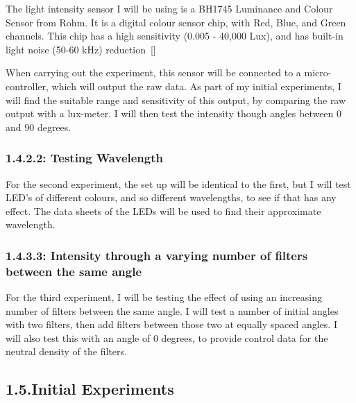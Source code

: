 \documentclass{article}
\begin{document}
The light intensity sensor I will be using is a BH1745 Luminance and Colour Sensor from Rohm. It is a digital colour sensor chip, with Red, Blue, and Green channels. This chip has a high sensitivity (0.005 - 40,000 Lux), and has built-in light noise (50-60 kHz) reduction~{}[]%

When carrying out the experiment, this sensor will be connected to a micro-controller, which will output the raw data. As part of my initial experiments, I will find the suitable range and sensitivity of this output, by comparing the raw output with a lux-meter. I will then test the intensity though angles between 0 and 90 degrees.%

\subsubsection{1.4.2.\hspace*{0.5em}2: Testing Wavelength}\label{sec-2--testing-wavelength}%

\noindent{}For the second experiment, the set up will be identical to the first, but I will test LED's of different colours, and so different wavelengths, to see if that has any effect. The data sheets of the LEDs will be used to find their approximate wavelength.%

\subsubsection{1.4.3.\hspace*{0.5em}3: Intensity through a varying number of filters between the same angle}\label{sec-3--intensity-through-a-varying-number-of-filters-between-the-same-angle}%

\noindent{}For the third experiment, I will be testing the effect of using an increasing number of filters between the same angle. I will test a number of initial angles with two filters, then add filters between those two at equally spaced angles. I will also test this with an angle of 0 degrees, to provide control data for the neutral density of the filters.%

\subsection{1.5.\hspace*{0.5em}Initial Experiments}\label{sec-initial-experiments}%
\end{document}
